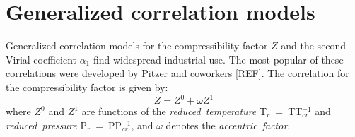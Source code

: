 \documentclass[11pt]{article}
\theoremstyle{definition}
\begin{document}
\clearpage

\section*{Generalized correlation models}
Generalized correlation models for the compressibility factor $Z$ and the second Virial coefficient $\alpha_{1}$ find widespread industrial use.
The most popular of these correlations were developed by Pitzer and coworkers [REF].
The correlation for the compressibility factor is given by:
\begin{equation}
	Z = Z^{0}+\omega Z^{1}
\end{equation}where $Z^{0}$ and $Z^{1}$ are functions of the \textit{reduced~temperature} T$_{r}$~=~TT$_{cr}^{-1}$ and \textit{reduced~pressure} P$_{r}$~=~PP$_{cr}^{-1}$,
and $\omega$ denotes the \textit{accentric~factor}.



\end{document}
